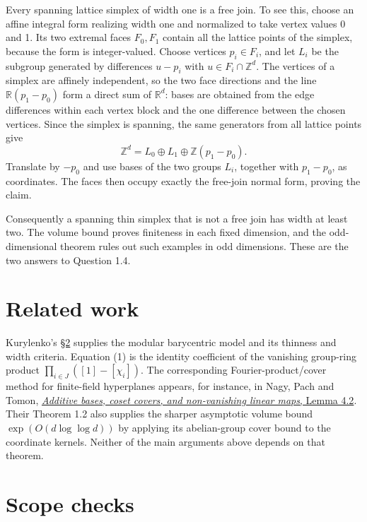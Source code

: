 \documentclass[11pt]{article}
\begin{document}
Every spanning lattice simplex of width one is a free join. To see this, choose an affine integral form realizing width one and normalized to take vertex values 0 and 1. Its two extremal faces \(F_0,F_1\) contain all the lattice points of the simplex, because the form is integer-valued. Choose vertices \(p_i\in F_i\), and let \(L_i\) be the subgroup generated by differences \(u-p_i\) with \(u\in F_i\cap\mathbb Z^d\). The vertices of a simplex are affinely independent, so the two face directions and the line \(\mathbb R(p_1-p_0)\) form a direct sum of \(\mathbb R^d\): bases are obtained from the edge differences within each vertex block and the one difference between the chosen vertices. Since the simplex is spanning, the same generators from all lattice points give
\[
\mathbb Z^d=L_0\oplus L_1\oplus\mathbb Z(p_1-p_0).
\]
Translate by \(-p_0\) and use bases of the two groups \(L_i\), together with \(p_1-p_0\), as coordinates. The faces then occupy exactly the free-join normal form, proving the claim.

Consequently a spanning thin simplex that is not a free join has width at least two. The volume bound proves finiteness in each fixed dimension, and the odd-dimensional theorem rules out such examples in odd dimensions. These are the two answers to Question 1.4.

\section{Related work}\label{related-work}

Kurylenko's \href{https://arxiv.org/html/2404.03975v2\#S2}{§2} supplies the modular barycentric model and its thinness and width criteria. Equation (1) is the identity coefficient of the vanishing group-ring product \(\prod_{i\in J}([1]-[\chi_i])\). The corresponding Fourier-product/cover method for finite-field hyperplanes appears, for instance, in Nagy, Pach and Tomon, \href{https://arxiv.org/html/2111.13658v1\#S4.Lemlem2}{\emph{Additive bases, coset covers, and non-vanishing linear maps}, Lemma 4.2}. Their Theorem 1.2 also supplies the sharper asymptotic volume bound \(\exp(O(d\log\log d))\) by applying its abelian-group cover bound to the coordinate kernels. Neither of the main arguments above depends on that theorem.

\section{Scope checks}\label{scope-checks}
\end{document}
